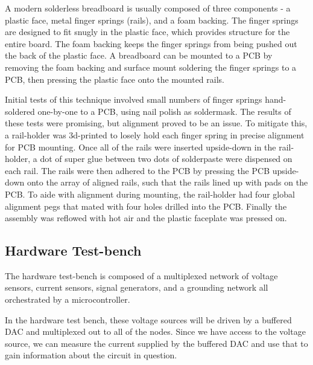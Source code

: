 \documentclass[11pt, a4paper]{article}
\begin{document}
A modern solderless breadboard is usually composed of three components - a plastic face, metal finger springs (rails), and a foam backing.
The finger springs are designed to fit snugly in the plastic face, which provides structure for the entire board.
The foam backing keeps the finger springs from being pushed out the back of the plastic face.
A breadboard can be mounted to a PCB by removing the foam backing and surface mount soldering the finger springs to a PCB, then pressing the plastic face onto the mounted rails.

Initial tests of this technique involved small numbers of finger springs hand-soldered one-by-one to a PCB, using nail polish as soldermask.
The results of these tests were promising, but alignment proved to be an issue.
To mitigate this, a rail-holder was 3d-printed to losely hold each finger spring in precise alignment for PCB mounting.
Once all of the rails were inserted upside-down in the rail-holder, a dot of super glue between two dots of solderpaste were dispensed on each rail.
The rails were then adhered to the PCB by pressing the PCB upside-down onto the array of aligned rails, such that the rails lined up with pads on the PCB. 
To aide with alignment during mounting, the rail-holder had four global alignment pegs that mated with four holes drilled into the PCB.
Finally the assembly was reflowed with hot air and the plastic faceplate was pressed on.



\subsection{Hardware Test-bench}

The hardware test-bench is composed of a multiplexed network of voltage sensors, current sensors, signal generators, and a grounding network all orchestrated by a microcontroller.  

In the hardware test bench, these voltage sources will be driven by a buffered DAC and multiplexed out to all of the nodes.
Since we have access to the voltage source, we can measure the current supplied by the buffered DAC and use that to gain information about the circuit in question.
\end{document}
